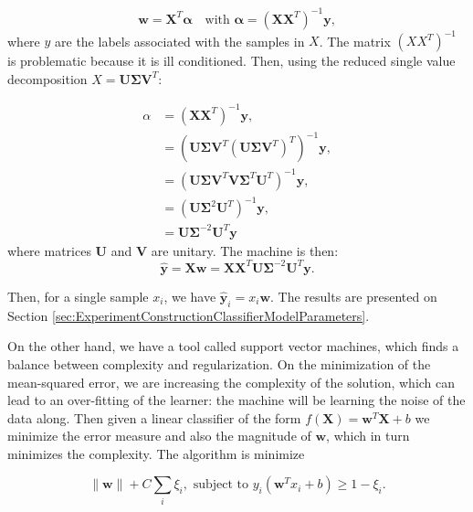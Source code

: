 \documentclass[letterpaper, 10 pt, conference]{ieeeconf}  %
\begin{document}
\begin{equation*}
   \mathbf{w} = \mathbf{X}^{T} \mathbf{\alpha} \quad \text{with } \mathbf{\alpha} = (\mathbf{XX}^{T})^{-1}\mathbf{y},
\end{equation*}
where $y$ are the labels associated with the samples in $X$. The matrix $(XX^{T})^{-1}$ is problematic because it is ill 
conditioned. Then, using the reduced single value decomposition $X = \mathbf{U}\mathbf{\Sigma} \mathbf{V}^{T}$:

\begin{equation*}
\begin{aligned}
    \alpha &= (\mathbf{XX}^{T})^{-1}\mathbf{y}, \\
                 &= (\mathbf{U} \mathbf{\Sigma} \mathbf{V}^{T}(\mathbf{U}\mathbf{\Sigma} \mathbf{V}^{T})^{T})^{-1}\mathbf{y},\\
                 &= (\mathbf{U} \mathbf{\Sigma} \mathbf{V}^{T} \mathbf{V} \mathbf{\Sigma}^{T} \mathbf{U}^{T})^{-1}\mathbf{y},\\
                 &= (\mathbf{U} \mathbf{\Sigma}^{2} \mathbf{U}^{T})^{-1}\mathbf{y},\\
                 &= \mathbf{U}\mathbf{\Sigma}^{-2} \mathbf{U}^{T} \mathbf{y}
\end{aligned}
\end{equation*}
where matrices $ \mathbf{U}$ and $ \mathbf{V}$ are unitary. The machine is then:
\begin{equation*}
    \hat{ \mathbf{y}} = \mathbf{ Xw}=  \mathbf{X X}^{T} \mathbf{U \Sigma}^{-2}  \mathbf{U}^{T}  \mathbf{y}.
\end{equation*}

Then, for a single sample $x_{i}$, we have $ \hat{ \mathbf{y}}_{i} = x_{i}\mathbf{w}$. The results are presented on Section  \ref{sec:ExperimentConstructionClassifierModelParameters}.

On the other hand, we have a tool called support vector machines, which finds a balance between complexity and regularization. On the minimization of the mean-squared error, we are increasing the complexity of the solution, which can lead to an over-fitting of the learner: the machine will be learning the noise of the data along. Then given a linear classifier of the form $f(\mathbf{X}) = \mathbf{w}^{T}\mathbf{X} + b$ we minimize the error measure and also the magnitude of $ \mathbf{w}$, which in turn minimizes the complexity. The algorithm is minimize

\begin{equation*}
 \| \mathbf{w} \| + C \sum_{i} \xi_{i}, \text{ subject to } y_{i}(\mathbf{w}^{T}x_{i} + b ) \geq 1 - \xi_{i}.
\end{equation*}
\end{document}
